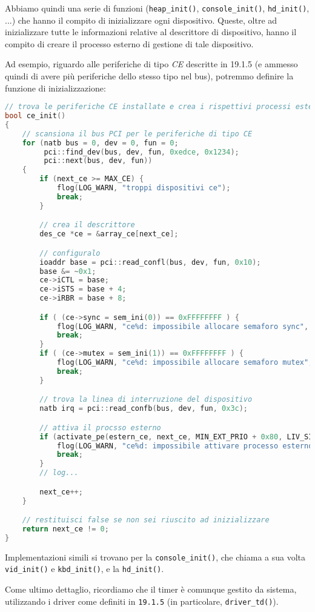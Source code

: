 \documentclass[a4paper,11pt]{article}
\begin{document}
Abbiamo quindi una serie di funzioni (\lstinline|heap_init()|, \lstinline|console_init()|, \lstinline|hd_init()|, ...) che hanno il compito di inizializzare ogni dispositivo.
Queste, oltre ad inizializzare tutte le informazioni relative al descrittore di dispositivo, hanno il compito di creare il processo esterno di gestione di tale dispositivo.

Ad esempio, riguardo alle periferiche di tipo \textit{CE} descritte in 19.1.5 (e ammesso quindi di avere più periferiche dello stesso tipo nel bus), potremmo definire la funzione di inizializzazione:
\begin{lstlisting}[language=C++, style=codestyle]	
// trova le periferiche CE installate e crea i rispettivi processi esterni
bool ce_init()
{
	// scansiona il bus PCI per le periferiche di tipo CE
	for (natb bus = 0, dev = 0, fun = 0;
	     pci::find_dev(bus, dev, fun, 0xedce, 0x1234);
	     pci::next(bus, dev, fun))
	{
		if (next_ce >= MAX_CE) {
			flog(LOG_WARN, "troppi dispositivi ce");
			break;
		}

		// crea il descrittore
		des_ce *ce = &array_ce[next_ce];

		// configuralo
		ioaddr base = pci::read_confl(bus, dev, fun, 0x10);
		base &= ~0x1;
		ce->iCTL = base;
		ce->iSTS = base + 4;
		ce->iRBR = base + 8;

		if ( (ce->sync = sem_ini(0)) == 0xFFFFFFFF ) {
			flog(LOG_WARN, "ce%d: impossibile allocare semaforo sync", next_ce);
			break;
		}
		if ( (ce->mutex = sem_ini(1)) == 0xFFFFFFFF ) {
			flog(LOG_WARN, "ce%d: impossibile allocare semaforo mutex", next_ce);
			break;
		}

		// trova la linea di interruzione del dispositivo
		natb irq = pci::read_confb(bus, dev, fun, 0x3c);

		// attiva il procsso esterno
		if (activate_pe(estern_ce, next_ce, MIN_EXT_PRIO + 0x80, LIV_SISTEMA, irq) == 0xFFFFFFFF) {
			flog(LOG_WARN, "ce%d: impossibile attivare processo esterno", next_ce);
			break;
		}
		// log...

		next_ce++;
	}

	// restituisci false se non sei riuscito ad inizializzare
	return next_ce != 0;
}
\end{lstlisting}

Implementazioni simili si trovano per la \lstinline|console_init()|, che chiama a sua volta \lstinline|vid_init()| e \lstinline|kbd_init()|, e la \lstinline|hd_init()|.

Come ultimo dettaglio, ricordiamo che il timer è comunque gestito da sistema, utilizzando i driver come definiti in \lstinline|19.1.5| (in particolare, \lstinline|driver_td()|). 
\end{document}
